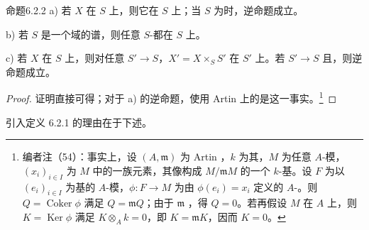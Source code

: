 \begin{SGAresult}{命题}{6.2.2}
a) 若 $X$ 在 $S$ 上，则它在 $S$ 上；当 $S$ 为时，逆命题成立。

b) 若 $S$ 是一个域的谱，则任意 $S$-都在 $S$ 上。

c) 若 $X$ 在 $S$ 上，则对任意 $S'\to S$，$X'=X\times_S S'$ 在 $S'$ 上。若 $S'\to S$ 且，则逆命题成立。
\end{SGAresult}
\begin{proof}
证明直接可得；对于 a) 的逆命题，使用 Artin 上的是这一事实。\footnote{编者注（54）：事实上，设 $(A,\mathfrak m)$ 为 Artin ，$k$ 为其，$M$ 为任意 $A$-模，$(x_i)_{i\in I}$ 为 $M$ 中的一族元素，其像构成 $M/\mathfrak mM$ 的一个 $k$-基。设 $F$ 为以 $(e_i)_{i\in I}$ 为基的 $A$-模，$\phi:F\to M$ 为由 $\phi(e_i)=x_i$ 定义的 $A$-。则 $Q=\operatorname{Coker}\phi$ 满足 $Q=\mathfrak mQ$；由于 $\mathfrak m$ ，得 $Q=0$。若再假设 $M$ 在 $A$ 上，则 $K=\operatorname{Ker}\phi$ 满足 $K\otimes_A k=0$，即 $K=\mathfrak mK$，因而 $K=0$。}
\end{proof}
引入定义 6.2.1 的理由在于下述。

